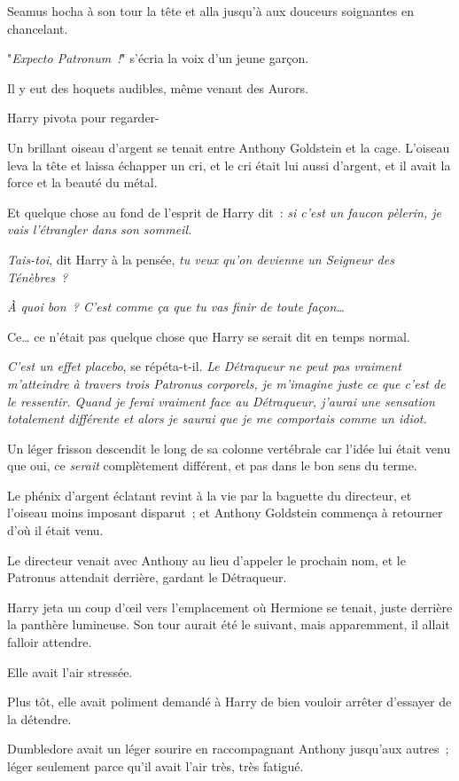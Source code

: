 Seamus hocha à son tour la tête et alla jusqu'à aux douceurs soignantes en chancelant.

"\emph{Expecto Patronum~!}" s'écria la voix d'un jeune garçon.

Il y eut des hoquets audibles, même venant des Aurors.

Harry pivota pour regarder-

Un brillant oiseau d'argent se tenait entre Anthony Goldstein et la cage. L'oiseau leva la tête et laissa échapper un cri, et le cri était lui aussi d'argent, et il avait la force et la beauté du métal.

Et quelque chose au fond de l'esprit de Harry dit~: \emph{si c'est un faucon pèlerin, je vais l'étrangler dans son sommeil.}

\emph{Tais-toi}, dit Harry à la pensée, \emph{tu veux qu'on devienne un Seigneur des Ténèbres~?}

\emph{À quoi bon~? C'est comme ça que tu vas finir de toute façon…}

Ce… ce n'était pas quelque chose que Harry se serait dit en temps normal.

\emph{C'est un effet placebo}, se répéta-t-il. \emph{Le Détraqueur ne peut pas vraiment m'atteindre à travers trois Patronus corporels, je m'imagine juste ce que c'est de le ressentir. Quand je ferai vraiment face au Détraqueur, j'aurai une sensation totalement différente et alors je saurai que je me comportais comme un idiot.}

Un léger frisson descendit le long de sa colonne vertébrale car l'idée lui était venu que oui, ce \emph{serait} complètement différent, et pas dans le bon sens du terme.

Le phénix d'argent éclatant revint à la vie par la baguette du directeur, et l'oiseau moins imposant disparut~; et Anthony Goldstein commença à retourner d'où il était venu.

Le directeur venait avec Anthony au lieu d'appeler le prochain nom, et le Patronus attendait derrière, gardant le Détraqueur.

Harry jeta un coup d'œil vers l'emplacement où Hermione se tenait, juste derrière la panthère lumineuse. Son tour aurait été le suivant, mais apparemment, il allait falloir attendre.

Elle avait l'air stressée.

Plus tôt, elle avait poliment demandé à Harry de bien vouloir arrêter d'essayer de la détendre.

Dumbledore avait un léger sourire en raccompagnant Anthony jusqu'aux autres~; léger seulement parce qu'il avait l'air très, très fatigué.

